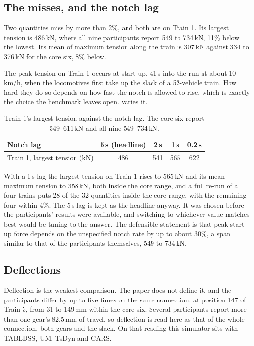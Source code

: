 \subsection{The misses, and the notch lag}

Two quantities miss by more than 2\%, and both are on Train 1. Its largest tension is 486\,kN, where all nine participants report 549 to 734\,kN, 11\% below the lowest. Its mean of maximum tension along the train is 307\,kN against 334 to 376\,kN for the core six, 8\% below.

The peak tension on Train 1 occurs at start-up, 41\,s into the run at about 10\,km/h, when the locomotives first take up the slack of a 52-vehicle train. How hard they do so depends on how fast the notch is allowed to rise, which is exactly the choice the benchmark leaves open.  varies it.

\begin{table}[htbp]
    \centering
    \small
    \begin{tabular}{lcccc}
        \toprule
        Notch lag & 5\,s (headline) & 2\,s & 1\,s & 0.2\,s \\
        \midrule
        Train 1, largest tension (kN) & 486 & 541 & 565 & 622 \\
        \bottomrule
    \end{tabular}
    \caption{Train 1's largest tension against the notch lag. The core six report 549--611\,kN and all nine 549--734\,kN.}
    \label{tab:bench_notch_lag}
\end{table}

With a 1\,s lag the largest tension on Train 1 rises to 565\,kN and its mean maximum tension to 358\,kN, both inside the core range, and a full re-run of all four trains puts 28 of the 32 quantities inside the core range, with the remaining four within 4\%. The 5\,s lag is kept as the headline anyway. It was chosen before the participants' results were available, and switching to whichever value matches best would be tuning to the answer. The defensible statement is that peak start-up force depends on the unspecified notch rate by up to about 30\%, a span similar to that of the participants themselves, 549 to 734\,kN.

\subsection{Deflections}

Deflection is the weakest comparison. The paper does not define it, and the participants differ by up to five times on the same connection: at position 147 of Train 3, from 31 to 149\,mm within the core six. Several participants report more than one gear's 82.5\,mm of travel, so deflection is read here as that of the whole connection, both gears and the slack. On that reading this simulator sits with TABLDSS, UM, TsDyn and CARS.

